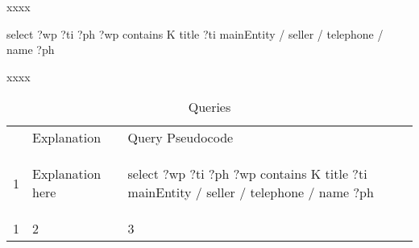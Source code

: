 xxxx

\begin{sparqlmini}
select ?wp ?ti ?ph
   ?wp contains K
      title ?ti
      mainEntity / seller / telephone / name ?ph
\end{sparqlmini}

xxxx

\begin{table} 
\begin{tabular}{ l l l }
 & Explanation & Query Pseudocode\\ 
%
1 & Explanation here & 
\begin{sparqlmini}
select ?wp ?ti ?ph
   ?wp contains K
      title ?ti
      mainEntity / seller / telephone / name ?ph
\end{sparqlmini}\\
1&2&3
%
\end{tabular} 
    \caption{Queries} 
\end{table}

